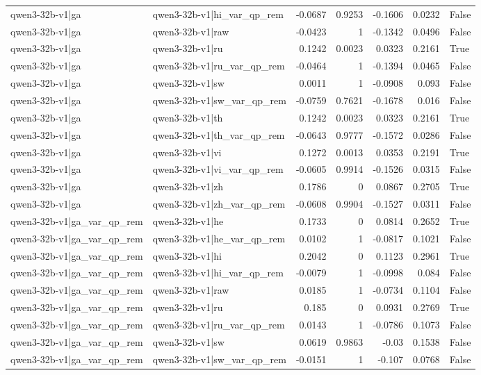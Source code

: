\begin{table}
\begin{tabular}{l l r r r r l}
qwen3-32b-v1|ga & qwen3-32b-v1|hi_var_qp_rem & -0.0687 & 0.9253 & -0.1606 & 0.0232 & False \\
qwen3-32b-v1|ga & qwen3-32b-v1|raw & -0.0423 & 1 & -0.1342 & 0.0496 & False \\
qwen3-32b-v1|ga & qwen3-32b-v1|ru & 0.1242 & 0.0023 & 0.0323 & 0.2161 & True \\
qwen3-32b-v1|ga & qwen3-32b-v1|ru_var_qp_rem & -0.0464 & 1 & -0.1394 & 0.0465 & False \\
qwen3-32b-v1|ga & qwen3-32b-v1|sw & 0.0011 & 1 & -0.0908 & 0.093 & False \\
qwen3-32b-v1|ga & qwen3-32b-v1|sw_var_qp_rem & -0.0759 & 0.7621 & -0.1678 & 0.016 & False \\
qwen3-32b-v1|ga & qwen3-32b-v1|th & 0.1242 & 0.0023 & 0.0323 & 0.2161 & True \\
qwen3-32b-v1|ga & qwen3-32b-v1|th_var_qp_rem & -0.0643 & 0.9777 & -0.1572 & 0.0286 & False \\
qwen3-32b-v1|ga & qwen3-32b-v1|vi & 0.1272 & 0.0013 & 0.0353 & 0.2191 & True \\
qwen3-32b-v1|ga & qwen3-32b-v1|vi_var_qp_rem & -0.0605 & 0.9914 & -0.1526 & 0.0315 & False \\
qwen3-32b-v1|ga & qwen3-32b-v1|zh & 0.1786 & 0 & 0.0867 & 0.2705 & True \\
qwen3-32b-v1|ga & qwen3-32b-v1|zh_var_qp_rem & -0.0608 & 0.9904 & -0.1527 & 0.0311 & False \\
qwen3-32b-v1|ga_var_qp_rem & qwen3-32b-v1|he & 0.1733 & 0 & 0.0814 & 0.2652 & True \\
qwen3-32b-v1|ga_var_qp_rem & qwen3-32b-v1|he_var_qp_rem & 0.0102 & 1 & -0.0817 & 0.1021 & False \\
qwen3-32b-v1|ga_var_qp_rem & qwen3-32b-v1|hi & 0.2042 & 0 & 0.1123 & 0.2961 & True \\
qwen3-32b-v1|ga_var_qp_rem & qwen3-32b-v1|hi_var_qp_rem & -0.0079 & 1 & -0.0998 & 0.084 & False \\
qwen3-32b-v1|ga_var_qp_rem & qwen3-32b-v1|raw & 0.0185 & 1 & -0.0734 & 0.1104 & False \\
qwen3-32b-v1|ga_var_qp_rem & qwen3-32b-v1|ru & 0.185 & 0 & 0.0931 & 0.2769 & True \\
qwen3-32b-v1|ga_var_qp_rem & qwen3-32b-v1|ru_var_qp_rem & 0.0143 & 1 & -0.0786 & 0.1073 & False \\
qwen3-32b-v1|ga_var_qp_rem & qwen3-32b-v1|sw & 0.0619 & 0.9863 & -0.03 & 0.1538 & False \\
qwen3-32b-v1|ga_var_qp_rem & qwen3-32b-v1|sw_var_qp_rem & -0.0151 & 1 & -0.107 & 0.0768 & False \\

\end{tabular}
\end{table}
